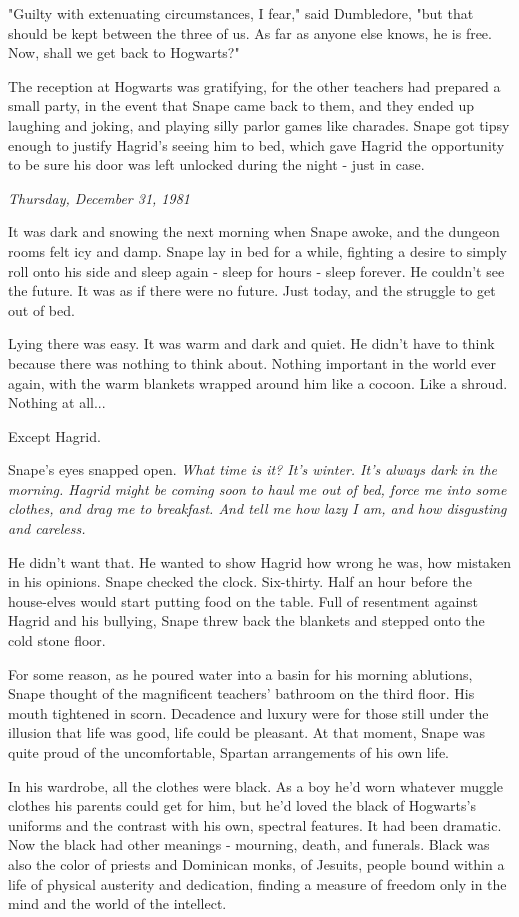 \documentclass[a4paper,11pt]{article}
\begin{document}
"Guilty with extenuating circumstances, I fear," said Dumbledore, "but that should be kept between the three of us. As far as anyone else knows, he is free. Now, shall we get back to Hogwarts?"

The reception at Hogwarts was gratifying, for the other teachers had prepared a small party, in the event that Snape came back to them, and they ended up laughing and joking, and playing silly parlor games like charades. Snape got tipsy enough to justify Hagrid's seeing him to bed, which gave Hagrid the opportunity to be sure his door was left unlocked during the night - just in case.

\emph{Thursday, December 31, 1981}

It was dark and snowing the next morning when Snape awoke, and the dungeon rooms felt icy and damp. Snape lay in bed for a while, fighting a desire to simply roll onto his side and sleep again - sleep for hours - sleep forever. He couldn't see the future. It was as if there were no future. Just today, and the struggle to get out of bed.

Lying there was easy. It was warm and dark and quiet. He didn't have to think because there was nothing to think about. Nothing important in the world ever again, with the warm blankets wrapped around him like a cocoon. Like a shroud. Nothing at all...

Except Hagrid.

Snape's eyes snapped open. \emph{What time is it? It's winter. It's always dark in the morning. Hagrid might be coming soon to haul me out of bed, force me into some clothes, and drag me to breakfast. And tell me how lazy I am, and how disgusting and careless.}

He didn't want that. He wanted to show Hagrid how wrong he was, how mistaken in his opinions. Snape checked the clock. Six-thirty. Half an hour before the house-elves would start putting food on the table. Full of resentment against Hagrid and his bullying, Snape threw back the blankets and stepped onto the cold stone floor.

For some reason, as he poured water into a basin for his morning ablutions, Snape thought of the magnificent teachers' bathroom on the third floor. His mouth tightened in scorn. Decadence and luxury were for those still under the illusion that life was good, life could be pleasant. At that moment, Snape was quite proud of the uncomfortable, Spartan arrangements of his own life.

In his wardrobe, all the clothes were black. As a boy he'd worn whatever muggle clothes his parents could get for him, but he'd loved the black of Hogwarts's uniforms and the contrast with his own, spectral features. It had been dramatic. Now the black had other meanings - mourning, death, and funerals. Black was also the color of priests and Dominican monks, of Jesuits, people bound within a life of physical austerity and dedication, finding a measure of freedom only in the mind and the world of the intellect.
\end{document}
